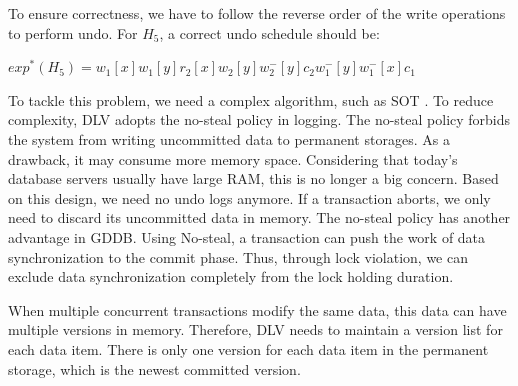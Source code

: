 \documentclass[conference]{IEEEtran}
\begin{document}
To ensure correctness, we have to follow the reverse order of the write operations to perform undo.
For ${H_5}$, a correct undo schedule should be:
\begin{center}
${exp^*(H_5) = w_1[x]w_1[y]r_2[x]w_2[y]w^-_2[y]c_2w^-_1[y]w^-_1[x]c_1}$
\end{center}

To tackle this problem, we need a complex algorithm, such as SOT \cite{UnifyCR:journals/is/AlonsoVABASW94}.
To reduce complexity, DLV adopts the no-steal policy in logging.
The no-steal policy forbids the system from writing uncommitted data to permanent storages.
As a drawback, it may consume more memory space.
Considering that today's database servers usually have large RAM, this is no longer a big concern.
Based on this design, we need no undo logs anymore. If a transaction aborts, we only need to discard its uncommitted data in memory.
The no-steal policy has another advantage in GDDB.
Using No-steal, a transaction can push the work of data synchronization to the commit phase.
Thus, through lock violation, we can exclude data synchronization completely from the lock holding duration.

When multiple concurrent transactions modify the same data, this data can have multiple versions in memory.
Therefore, DLV needs to maintain a version list for each data item.
There is only one version for each data item in the permanent storage, which is the newest committed version.
\end{document}
